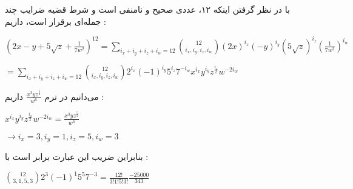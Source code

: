 \p
با در نظر گرفتن اینکه ۱۲، عددی صحیح و نا‌منفی است و شرط قضیه ضرایب چند جمله‌ای برقرار است، داریم :
\begin{center}
  $(2x - y + 5\sqrt{z} + \frac{1}{7w^2})^12 = \sum\limits_{i_x+i_y+i_z+i_w=12} \binom{12}{i_x,i_y,i_z,i_w} (2x)^{i_x} (-y)^{i_y} (5\sqrt{z})^{i_z} (\frac{1}{7w^2})^{i_w}$

  $= \sum\limits_{i_x+i_y+i_z+i_w=12} \binom{12}{i_x,i_y,i_z,i_w} 2^{i_x} (-1)^{i_y} 5^{i_z} 7^{-i_w} x^{i_x} y^{i_y} z^{\frac{i_z}{2}} w^{-2i_w}$
\end{center}
می‌دانیم در ترم 
$\frac{x^3 y z^{\frac{5}{2}}}{w^6}$
داریم :
\begin{center}
  $x^{i_x} y^{i_y} z^{\frac{i_z}{2}} w^{-2i_w} = \frac{x^3 y z^{\frac{5}{2}}}{w^6}$

  $\rightarrow i_x = 3 , i_y = 1 , i_z = 5 , i_w = 3$
\end{center}
بنابراین ضریب این عبارت برابر است با :
\begin{center}
  $\binom{12}{3,1,5,3} 2^3 (-1)^1 5^5 7^{-3} = \frac{12!}{3!1!5!3!} \frac{-25000}{343}$
\end{center}